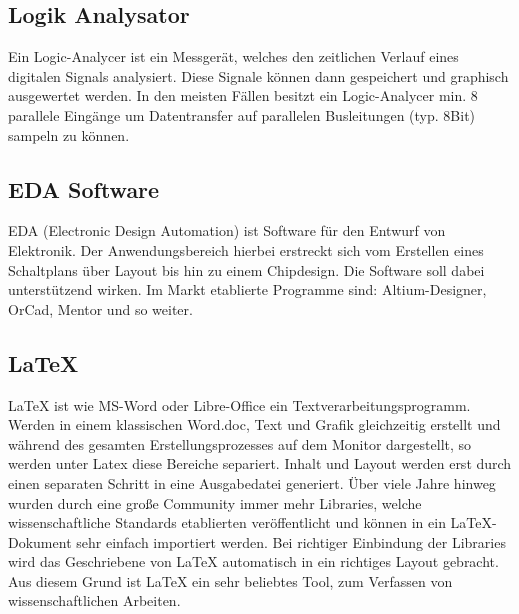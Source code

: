 \documentclass[a4paper,11pt]{scrartcl}
\begin{document}

\subsection{Logik Analysator}
Ein Logic-Analycer ist ein Messgerät, welches den zeitlichen Verlauf eines digitalen Signals analysiert. Diese Signale können dann gespeichert und graphisch ausgewertet werden. In den meisten Fällen besitzt ein Logic-Analycer min. 8 parallele Eingänge um Datentransfer auf parallelen Busleitungen (typ. 8Bit) sampeln zu können. 


\subsection{EDA Software}
EDA (Electronic Design Automation) ist Software für den Entwurf von Elektronik. Der Anwendungsbereich hierbei erstreckt sich vom Erstellen eines Schaltplans über Layout bis hin zu einem Chipdesign. Die Software soll dabei unterstützend wirken. Im Markt etablierte Programme sind: Altium-Designer, OrCad, Mentor und so weiter. 


\newpage
\subsection{LaTeX}
LaTeX ist wie MS-Word oder Libre-Office ein Textverarbeitungsprogramm. Werden in einem klassischen Word.doc, Text und Grafik gleichzeitig erstellt und während des gesamten Erstellungsprozesses auf dem Monitor dargestellt, so werden unter Latex diese Bereiche separiert. Inhalt und Layout werden erst durch einen separaten Schritt in eine Ausgabedatei generiert. Über viele Jahre hinweg wurden durch eine große Community immer mehr Libraries, welche wissenschaftliche Standards etablierten veröffentlicht und können in ein LaTeX-Dokument sehr einfach importiert werden. Bei richtiger Einbindung der Libraries wird das Geschriebene von LaTeX automatisch in ein richtiges Layout gebracht. Aus diesem Grund ist LaTeX ein sehr beliebtes Tool, zum Verfassen von wissenschaftlichen Arbeiten.
\end{document}
